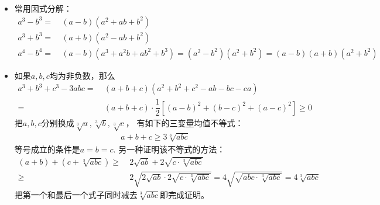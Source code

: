 \begin{itemize}[leftmargin=\inteval{\myitemleftmargin}pt,itemsep=
   \inteval{\myitemitempsep}pt,topsep=\inteval{\myitemtopsep}pt]
%

\item 常用因式分解：
\begin{align*}
    a^3-b^3=&\ (a-b)(a^2+ab+b^2) \\
    a^3+b^3=&\ (a+b)(a^2-ab+b^2) \\
    a^4-b^4=&\ (a-b)(a^3+a^2b+ab^2+b^3)=(a^2-b^2)(a^2+b^2)=(a-b)(a+b)(a^2+b^2) 
\end{align*}

\item 如果$ a,b,c $均为非负数，那么
\begin{align*}
    a^3+b^3+c^3-3abc=&\ (a+b+c)(a^2+b^2+c^2-ab-bc-ca) \\
    =&\ (a+b+c)\cdot \dfrac{1}{2}\left[
    (a-b)^2+(b-c)^2+(a-c)^2 \right] \geq 0
\end{align*}
把$ a,b,c $分别换成$ \sqrt[3]{a},\sqrt[3]{b},\sqrt[3]{c} $，
有如下的三变量均值不等式：
\begin{gather}
    a+b+c \geq 3 \sqrt[3]{abc}  \label{三变量均值不等式}
\end{gather}
等号成立的条件是$a=b=c$. 另一种证明该不等式的方法：
\begin{align*}
    (a+b)+\left(c+\sqrt[3]{abc}\right)
    \geq&\ 2\sqrt{ab}+2\sqrt{c\cdot\sqrt[3]{abc}} \\
    \geq&\ 2\sqrt{2\sqrt{ab}\cdot 2\sqrt{c\cdot \sqrt[3]{abc}}}
    = 4\sqrt{\sqrt{abc\cdot\sqrt[3]{abc}}}=4\sqrt[3]{abc}
\end{align*}
把第一个和最后一个式子同时减去$ \sqrt[3]{abc} $即完成证明。

\end{itemize}

